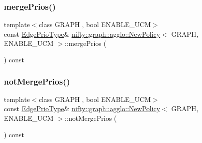 \mbox{\label{classnifty_1_1graph_1_1agglo_1_1NewPolicy_a93c53212f83b7427a3dd53d02fd06e4e}} 
\subsubsection{\texorpdfstring{merge\+Prios()}{mergePrios()}}
{\footnotesize\ttfamily template$<$class G\+R\+A\+PH , bool E\+N\+A\+B\+L\+E\+\_\+\+U\+CM$>$ \\
const \hyperlink{classnifty_1_1graph_1_1agglo_1_1NewPolicy_a19a7b9c67786f9dbf1dfb3c92aef141c}{Edge\+Prio\+Type}\& \hyperlink{classnifty_1_1graph_1_1agglo_1_1NewPolicy}{nifty\+::graph\+::agglo\+::\+New\+Policy}$<$ G\+R\+A\+PH, E\+N\+A\+B\+L\+E\+\_\+\+U\+CM $>$\+::merge\+Prios (\begin{DoxyParamCaption}{ }\end{DoxyParamCaption}) const\hspace{0.3cm}{\ttfamily [inline]}}

\mbox{\label{classnifty_1_1graph_1_1agglo_1_1NewPolicy_a63f56b84f75d674ababb3ae5266e1c75}} 
\subsubsection{\texorpdfstring{not\+Merge\+Prios()}{notMergePrios()}}
{\footnotesize\ttfamily template$<$class G\+R\+A\+PH , bool E\+N\+A\+B\+L\+E\+\_\+\+U\+CM$>$ \\
const \hyperlink{classnifty_1_1graph_1_1agglo_1_1NewPolicy_a19a7b9c67786f9dbf1dfb3c92aef141c}{Edge\+Prio\+Type}\& \hyperlink{classnifty_1_1graph_1_1agglo_1_1NewPolicy}{nifty\+::graph\+::agglo\+::\+New\+Policy}$<$ G\+R\+A\+PH, E\+N\+A\+B\+L\+E\+\_\+\+U\+CM $>$\+::not\+Merge\+Prios (\begin{DoxyParamCaption}{ }\end{DoxyParamCaption}) const\hspace{0.3cm}{\ttfamily [inline]}}



